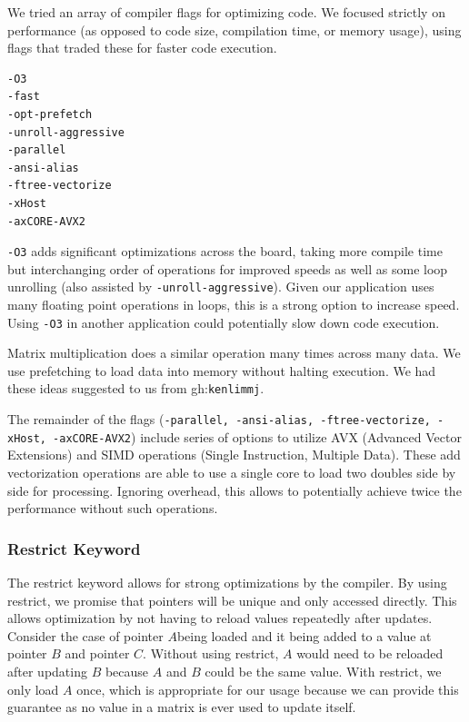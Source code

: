 \documentclass[12pt]{article}
\begin{document}
We tried an array of compiler flags for optimizing code. We focused strictly on performance (as opposed to code size, compilation time, or memory usage), using flags that traded these for faster code execution.

\begin{multicols}{3}
\begin{verbatim}
-O3 
-fast 
-opt-prefetch 
-unroll-aggressive
-parallel 
-ansi-alias 
-ftree-vectorize 
-xHost 
-axCORE-AVX2 
\end{verbatim}
\end{multicols}


\texttt{-O3} adds significant optimizations across the board, taking more compile time but interchanging order of operations for improved speeds as well as some loop unrolling (also assisted by \texttt{-unroll-aggressive}). Given our application uses many floating point operations in loops, this is a strong option to increase speed. Using \texttt{-O3} in another application could potentially slow down code execution.

Matrix multiplication does a similar operation many times across many data. We use prefetching to load data into memory without halting execution. We had these ideas suggested to us from gh:\texttt{kenlimmj}.

The remainder of the flags (\texttt{-parallel, -ansi-alias, -ftree-vectorize, -xHost,
-axCORE-AVX2}) include series of options to utilize AVX (Advanced Vector Extensions) and SIMD operations (Single Instruction, Multiple Data).  These add vectorization operations are able to use a single core to load two doubles side by side for processing. Ignoring overhead, this allows to potentially achieve twice the performance without such operations. 

\subsubsection{Restrict Keyword}

The restrict keyword allows for strong optimizations by the compiler. By using restrict, we promise that pointers will be unique and only accessed directly. This allows optimization by not having to reload values repeatedly  after updates. Consider the case of pointer $A $being loaded and it being added to a value at pointer $B$ and pointer $C$. Without using restrict, $A$ would need to be reloaded after updating $B$ because $A$ and $B$ could be the same value.  With restrict, we only load $A$ once, which is appropriate for our usage because we can provide this guarantee as no value in a matrix is ever used to update itself. 
\end{document}
